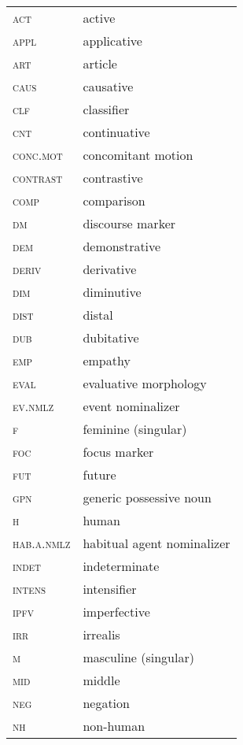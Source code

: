 \documentclass[output=paper]{langscibook}
\begin{document}
\begin{tabularx}{.45\textwidth}{lQ}
\textsc{act} & active \\
\textsc{appl} & applicative \\
\textsc{art} & article\\
\textsc{caus} & causative\\ 
\textsc{clf} & classifier\\
\textsc{cnt} & continuative\\
\textsc{conc.mot} & concomitant motion\\
\textsc{contrast} & contrastive \\
\textsc{comp} & comparison\\
\textsc{dm} & discourse marker\\
\textsc{dem} & demonstrative\\
\textsc{deriv} & derivative\\
\textsc{dim} &  diminutive\\
\textsc{dist} & distal\\
\textsc{dub} & dubitative\\
\textsc{emp} & empathy\\
\textsc{eval} &  evaluative morphology\\
\textsc{ev.nmlz} & event nominalizer\\
\textsc{f} & feminine (singular)\\
\textsc{foc} & focus marker \\ 
\textsc{fut} & future\\  
\textsc{gpn} & generic possessive noun\\
\textsc{h} & human\\ 
\textsc{hab.a.nmlz} & habitual agent nominalizer\\
\textsc{indet} & indeterminate\\
\textsc{intens} & intensifier\\
\textsc{ipfv} & imperfective\\
\textsc{irr} & irrealis\\  
\textsc{m} & masculine (singular)\\ 
\textsc{mid} & middle\\   
\textsc{neg} &  negation\\ 
\textsc{nh} &  non-human\\
\end{tabularx}
\end{document}
